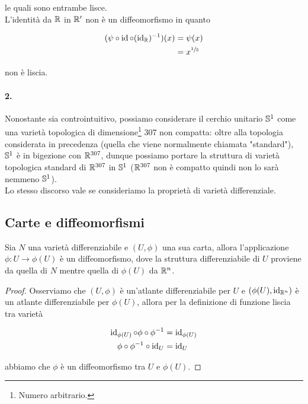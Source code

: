 le quali sono entrambe lisce.\\
L'identità da $ \R $ in $ \R' $ non è un diffeomorfismo in quanto

\begin{align}
	\begin{split}
		(\psi \circ \id \circ (\id_{\R})^{-1})(x) &= \psi(x)\\
		&= x^{\sfrac{1}{3}}
	\end{split}
\end{align}

non è liscia.

\paragraph{2.}

Nonostante sia controintuitivo, possiamo considerare il cerchio unitario $ \S^{1} $ come una varietà topologica di dimensione\footnote{%
	Numero arbitrario.%
} 307 non compatta: oltre alla topologia considerata in precedenza (quella che viene normalmente chiamata "standard"), $ \S^{1} $ è in bigezione con $ \R^{307} $, dunque possiamo portare la struttura di varietà topologica standard di $ \R^{307} $ in $ \S^{1} $ ($ \R^{307} $ non è compatto quindi non lo sarà nemmeno $ \S^{1} $).\\
Lo stesso discorso vale se consideriamo la proprietà di varietà differenziale.

\subsection{Carte e diffeomorfismi}

\begin{definition}
	Sia $ N $ una varietà differenziabile e $ (U,\phi) $ una sua carta, allora l'applicazione $ \phi : U \to \phi(U) $ è un diffeomorfismo, dove la struttura differenziabile di $ U $ proviene da quella di $ N $ mentre quella di $ \phi(U) $ da $ \R^{n} $.
\end{definition}

\begin{proof}
	Osserviamo che $ (U,\phi) $ è un'atlante differenziabile per $ U $ e $ (\phi(U),\id_{\R^{n}}) $ è un atlante differenziabile per $ \phi(U) $, allora per la definizione di funzione liscia tra varietà
	
	\begin{align}
		\begin{split}
			\id_{\phi(U)} \circ \phi \circ \phi^{-1} &= \id_{\phi(U)}\\
			\phi \circ \phi^{-1} \circ \id_{U} &= \id_{U}
		\end{split}	
	\end{align}

	abbiamo che $ \phi $ è un diffeomorfismo tra $ U $ e $ \phi(U) $.
\end{proof}


